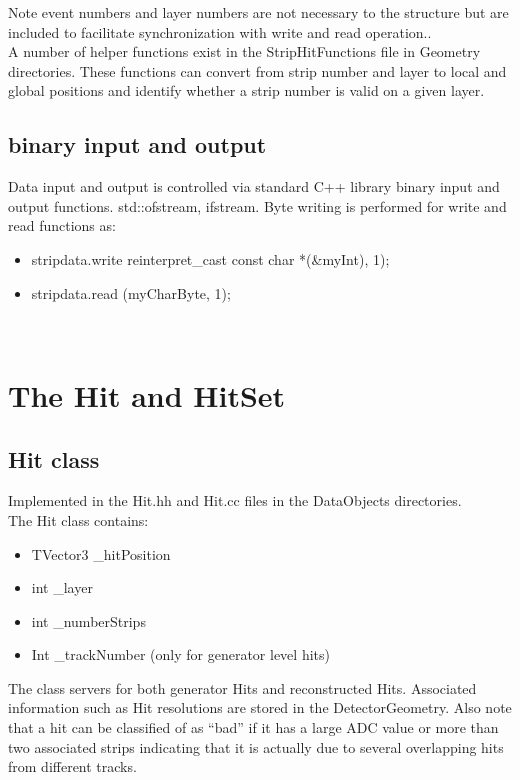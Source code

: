 \documentclass[aps,prd,superscriptaddress,floatfix]{revtex4}
\begin{document}
Note event numbers and layer numbers are not necessary to the
structure but are included to facilitate synchronization with write and read operation..
\\

A number of helper functions exist in the StripHitFunctions file in Geometry directories.  These functions
can convert from strip number and layer to local and global positions and identify whether a strip number is valid
on a given layer.

\subsection{binary input and output}
Data input and output is controlled via standard C++ library binary input and
output functions. std::ofstream, ifstream.  Byte writing is performed for write and read functions as:

\begin{itemize}
\item stripdata.write reinterpret\_cast const char *(\&myInt), 1);
\item stripdata.read (myCharByte, 1);
\end{itemize}
\

\section{The Hit and HitSet}
\subsection{Hit class}
Implemented in the Hit.hh and Hit.cc files in the DataObjects directories.
\\

The Hit class contains:\\

\begin{itemize}
\item TVector3 \_hitPosition
\item int \_layer
\item int \_numberStrips
\item Int \_trackNumber (only for generator level hits)
\end{itemize}


The class servers for both generator Hits and reconstructed Hits.   Associated information such as Hit resolutions
are stored in the DetectorGeometry.  Also note that a hit can be classified of as ``bad'' if it has a large ADC
value or more than two associated strips indicating that it is actually due to several overlapping hits from
different tracks.
\\
\end{document}
